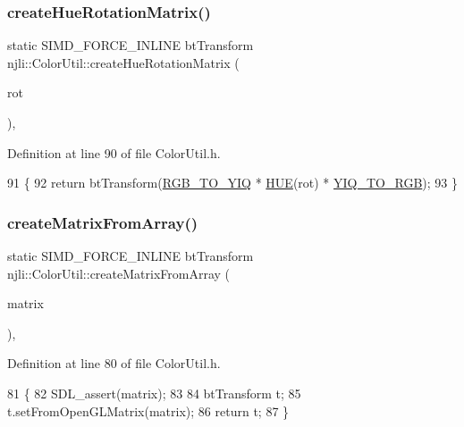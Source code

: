\subsubsection{\texorpdfstring{create\+Hue\+Rotation\+Matrix()}{createHueRotationMatrix()}}
{\footnotesize\ttfamily static S\+I\+M\+D\+\_\+\+F\+O\+R\+C\+E\+\_\+\+I\+N\+L\+I\+NE bt\+Transform njli\+::\+Color\+Util\+::create\+Hue\+Rotation\+Matrix (\begin{DoxyParamCaption}\item[{const double}]{rot }\end{DoxyParamCaption})\hspace{0.3cm}{\ttfamily [inline]}, {\ttfamily [static]}}



Definition at line 90 of file Color\+Util.\+h.


\begin{DoxyCode}
91     \{
92       \textcolor{keywordflow}{return} btTransform(\mbox{\hyperlink{classnjli_1_1_color_util_ae8aa4830ab0c084398eb830628323217}{RGB\_TO\_YIQ}} * \mbox{\hyperlink{classnjli_1_1_color_util_a500118a29045f966fb8c6ed8ea505e49}{HUE}}(rot) * \mbox{\hyperlink{classnjli_1_1_color_util_a9b3a5642a95a4cf7fbc782ac56acba4f}{YIQ\_TO\_RGB}});
93     \}
\end{DoxyCode}
\mbox{\label{classnjli_1_1_color_util_a85a15dfc97aa9126dc33b0b745b745c2}} 
\subsubsection{\texorpdfstring{create\+Matrix\+From\+Array()}{createMatrixFromArray()}}
{\footnotesize\ttfamily static S\+I\+M\+D\+\_\+\+F\+O\+R\+C\+E\+\_\+\+I\+N\+L\+I\+NE bt\+Transform njli\+::\+Color\+Util\+::create\+Matrix\+From\+Array (\begin{DoxyParamCaption}\item[{const bt\+Scalar $\ast$}]{matrix }\end{DoxyParamCaption})\hspace{0.3cm}{\ttfamily [inline]}, {\ttfamily [static]}}



Definition at line 80 of file Color\+Util.\+h.


\begin{DoxyCode}
81     \{
82       SDL\_assert(matrix);
83 
84       btTransform t;
85       t.setFromOpenGLMatrix(matrix);
86       \textcolor{keywordflow}{return} t;
87     \}
\end{DoxyCode}
\mbox{\label{classnjli_1_1_color_util_a3612463fc463d7fb5edad289bf02edb8}} 
